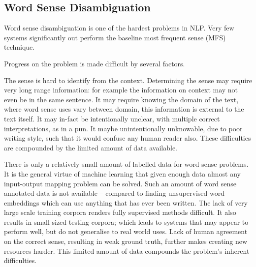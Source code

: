 \documentclass[12pt,parskip]{komatufte}
\begin{document}
\begin{figure}
{}
	
	
\end{figure}



\subsection{Word Sense Disambiguation}





Word sense disambiguation is one of the hardest problems in NLP.
Very few systems significantly out perform the baseline most frequent sense (MFS) technique.

Progress on the problem is made difficult by several factors.

The sense is hard to identify from the context.
Determining the sense may require very long range information:
for example the information on context may not even be in the same sentence.
It may require knowing the domain of the text, where word sense uses vary between domain, this information is external to the text itself.
It may in-fact be intentionally unclear, with multiple correct interpretations, as in a pun.
It maybe unintentionally unknowable, due to poor writing style, such that it would confuse any human reader also.
These difficulties are compounded by the limited amount of data available.

There is only a relatively small amount of labelled data for word sense problems.
It is the general virtue of machine learning that given enough data almost any input-output mapping problem can be solved.
Such an amount of word sense annotated data is not available -- compared to finding unsupervised word embeddings which can use anything that has ever been written.
The lack of very large scale training corpora renders fully supervised methods difficult.
It also results in small sized testing corpora; which leads to systems that may appear to perform well, but do not generalise to real world uses.
Lack of human agreement on the correct sense, resulting in weak ground truth, further makes creating new resources harder.
This limited amount of data compounds the problem's inherent difficulties.
\end{document}
